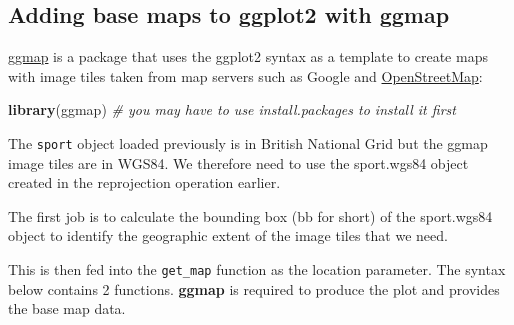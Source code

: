 \documentclass[]{article}
\newenvironment{Shaded}{}{}
\newcommand{\KeywordTok}[1]{\textcolor[rgb]{0.00,0.44,0.13}{\textbf{{#1}}}}
\newcommand{\DecValTok}[1]{\textcolor[rgb]{0.25,0.63,0.44}{{#1}}}
\newcommand{\FloatTok}[1]{\textcolor[rgb]{0.25,0.63,0.44}{{#1}}}
\newcommand{\StringTok}[1]{\textcolor[rgb]{0.25,0.44,0.63}{{#1}}}
\newcommand{\CommentTok}[1]{\textcolor[rgb]{0.38,0.63,0.69}{\textit{{#1}}}}
\newcommand{\NormalTok}[1]{{#1}}
\begin{document}
\subsection{Adding base maps to ggplot2 with
ggmap}\label{adding-base-maps-to-ggplot2-with-ggmap}

\href{http://journal.r-project.org/archive/2013-1/kahle-wickham.pdf}{ggmap}
is a package that uses the ggplot2 syntax as a template to create maps
with image tiles taken from map servers such as Google and
\href{http://www.openstreetmap.org/}{OpenStreetMap}:

\begin{Shaded}
\begin{Highlighting}[]
\KeywordTok{library}\NormalTok{(ggmap)  }\CommentTok{# you may have to use install.packages to install it first}
\end{Highlighting}
\end{Shaded}

The \texttt{sport} object loaded previously is in British National Grid
but the ggmap image tiles are in WGS84. We therefore need to use the
sport.wgs84 object created in the reprojection operation earlier.

The first job is to calculate the bounding box (bb for short) of the
sport.wgs84 object to identify the geographic extent of the image tiles
that we need.

\begin{Shaded}
\end{Shaded}

This is then fed into the \texttt{get\_map} function as the location
parameter. The syntax below contains 2 functions. \textbf{ggmap} is
required to produce the plot and provides the base map data.
\end{document}
